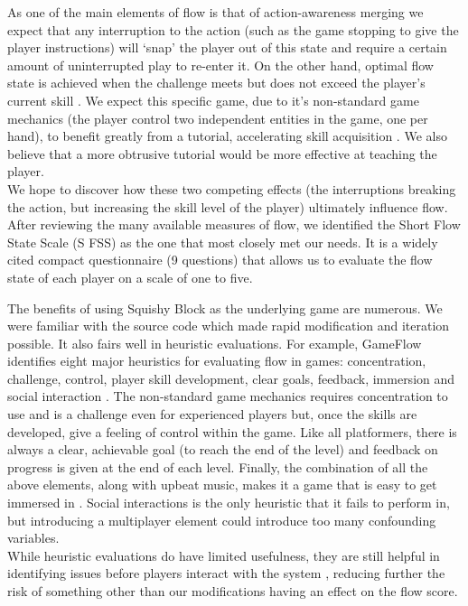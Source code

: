 \documentclass{acmsiggraph}
\begin{document}
As one of the main elements of flow is that of action-awareness merging \cite{jackson} we expect that any interruption to the action (such as the game stopping to give the player instructions) will ‘snap’ the player out of this state and require a certain amount of uninterrupted play to re-enter it.
On the other hand, optimal flow state is achieved when the challenge meets but does not exceed the player’s current skill \cite{nakamura}. We expect this specific game, due to it’s non-standard game mechanics (the player control two independent entities in the game, one per hand), to benefit greatly from a tutorial, accelerating skill acquisition \cite{andersen}. We also believe that a more obtrusive tutorial would be more effective at teaching the player.\\
We hope to discover how these two competing effects (the interruptions breaking the action, but increasing the skill level of the player) ultimately influence flow. After reviewing the many available measures of flow, we  identified the Short Flow State Scale (S FSS)\cite{jackson} as the one that most closely met our needs. It is a widely cited compact questionnaire (9 questions) that allows us to evaluate the flow state of each player on a scale of one to five.

The benefits of using Squishy Block as the underlying game are numerous. We were familiar with the source code which made rapid modification and iteration possible. It also fairs well in heuristic evaluations. For example, GameFlow identifies eight major heuristics for evaluating flow in games: concentration, challenge, control, player skill development, clear goals, feedback, immersion and social interaction \cite{sweetser}. The non-standard game mechanics requires concentration to use and is a challenge even for experienced players but, once the skills are developed, give a feeling of control within the game. Like all platformers, there is always a clear, achievable goal (to reach the end of the level) and feedback on progress is given at the end of each level. Finally, the combination of all the above elements, along with upbeat music, makes it a game that is easy to get immersed in \cite{sanders}. Social interactions is the only heuristic that it fails to perform in, but introducing a multiplayer element could introduce too many confounding variables.\\
While heuristic evaluations do have limited usefulness, they are still helpful in identifying issues before players interact with the system \cite{desurvire}, reducing further the risk of something other than our modifications having an effect on the flow score. 
\end{document}
